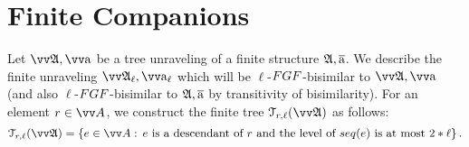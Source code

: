 
\section{Finite Companions}\label{sec:finite}
Let $\unravel{A}, \elemtuptuplea$ be a tree unraveling of a finite structure ${\mathfrak{A}}, \overline{\mathrm{a}}$.
We describe the finite unraveling $\unravel{A}_{\ell}, \elemtuptuplea_{\ell}$ which will be $\ell$-$\FGF$-bisimilar to $\unravel{A}, \elemtuptuplea$ (and also $\ell$-$\FGF$-bisimilar to ${\mathfrak{A}}, \overline{\mathrm{a}}$ by transitivity of bisimilarity).
For an element $r \in \unraveldom{A}$, we construct the finite tree $\mathcal{T}_{r,\ell}(\unravel{A})$ as follows:
\begin{equation*}
  \mathcal{T}_{r,\ell}(\unravel{A}) = \left\{ e \in \unraveldom{A}:\, e\ \text{is a descendant of $r$ and the level of $\seq{e}$ is at most $2 * \ell$} \right\}.
\end{equation*}

